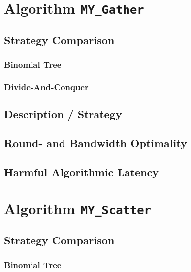 
\newcommand\mygather{\texttt{MY\_Gather}\xspace}
\newcommand\myscatter{\texttt{MY\_Scatter}\xspace}

\section{Algorithm \mygather}

\subsection{Strategy Comparison}

\subsubsection{Binomial Tree}

\subsubsection{Divide-And-Conquer}

\subsection{Description / Strategy}



\subsection{Round- and Bandwidth Optimality}

\subsection{Harmful Algorithmic Latency}

\section{Algorithm \myscatter}

\subsection{Strategy Comparison}

\subsubsection{Binomial Tree}

